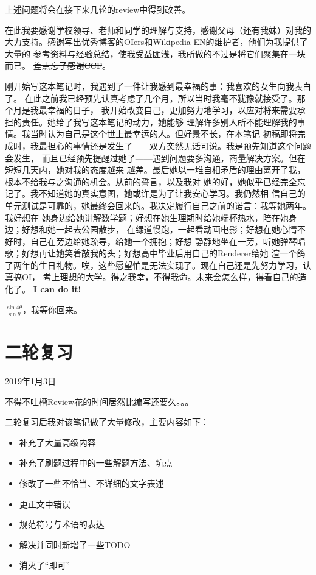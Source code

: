 上述问题将会在接下来几轮的review中得到改善。

在此我要感谢学校领导、老师和同学的理解与支持，感谢父母（还有我妹）对我的
大力支持。感谢写出优秀博客的OIers和Wikipedia-EN的维护者，他们为我提供了大量的
参考资料与经验总结，使我受益匪浅，我所做的不过是将它们聚集在一块而已。
\sout{差点忘了感谢CCF}。

刚开始写这本笔记时，我遇到了一件让我感到最幸福的事：我喜欢的女生向我表白了。
在此之前我已经预先认真考虑了几个月，所以当时我毫不犹豫就接受了。那个月是我最幸福的日子，
我开始改变自己，更加努力地学习，以应对将来需要承担的责任。她给了我写这本笔记的动力，她能够
理解许多别人所不能理解我的事情。我当时认为自己是这个世上最幸运的人。但好景不长，在本笔记
初稿即将完成时，我最担心的事情还是发生了——双方突然无话可说。我是预先知道这个问题会发生，
而且已经预先提醒过她了——遇到问题要多沟通，商量解决方案。但在短短几天内，她对我的态度越来
越差。最后她以一堆自相矛盾的理由离开了我，根本不给我与之沟通的机会。从前的誓言，以及我对
她的好，她似乎已经完全忘记了。我不知道她的真实意图，她或许是为了让我安心学习。我仍然相
信自己的单元测试是可靠的，她最终会回来的。我决定履行自己之前的诺言：我等她两年。我好想在
她身边给她讲解数学题；好想在她生理期时给她端杯热水，陪在她身边；好想和她一起去公园散步，
在绿道慢跑，一起看动画电影；好想在她心情不好时，自己在旁边给她疏导，给她一个拥抱；好想
静静地坐在一旁，听她弹琴唱歌；好想再让她笑着敲我的头；好想高中毕业后用自己的Renderer给她
渲一个鸽了两年的生日礼物。唉，这些愿望怕是无法实现了。现在自己还是先努力学习，认真搞OI，
考上理想的大学。\sout{得之我幸，不得我命。未来会怎么样，得看自己的造化了。}
{\bfseries I can do it!}

$\frac{\sin 4\theta}{\sin \theta}$，我等你回来。

\section{二轮复习}
2019年1月3日

不得不吐槽Review花的时间居然比编写还要久。。。

二轮复习后我对该笔记做了大量修改，主要内容如下：

\begin{itemize}
    \item 补充了大量高级内容
    \item 补充了刷题过程中的一些解题方法、坑点
    \item 修改了一些不恰当、不详细的文字表述
    \item 更正文中错误
    \item 规范符号与术语的表达
    \item 解决并同时新增了一些TODO
    \item \sout{消灭了``即可''}
\end{itemize}

